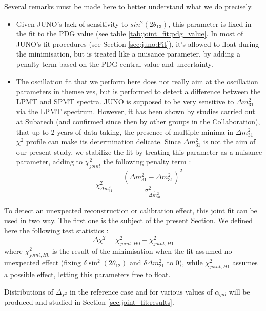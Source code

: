 \documentclass[../main.tex]{subfiles}
\begin{document}
Several remarks must be made here to better understand what we do precisely.
\begin{itemize}
  \item Given JUNO's lack of sensitivity to $sin^2(2\theta_{13})$, this parameter is fixed in the fit to the PDG value (see table \ref{tab:joint_fit:pdg_value}. In most of JUNO's fit procedures (see Section \ref{sec:juno:Fit}), it's allowed to float during the minimisation, but is treated like a nuisance parameter, by adding a penalty term based on the PDG central value and uncertainty.


 \item The oscillation fit that we perform here does not really aim at the oscillation parameters in themselves, but is performed to detect a difference between the LPMT and SPMT spectra. JUNO is supposed to be very sensitive to $\Delta m^2_{31}$ via the LPMT spectrum. However, it has been shown by studies carried out at Subatech (and confirmed since then by other groups in the Collaboration), that up to 2 years of data taking, the presence of multiple minima in $\Delta m^2_{31}$ $\chi^2$ profile can make its determination delicate. Since $\Delta m^2_{31}$ is not the aim of our present study, we stabilize the fit by treating this parameter as a nuisance parameter, adding to $\chi^2_{joint}$ the following penalty term :
    \begin{equation}
      \chi^2_{\Delta m^2_{31}} = \frac{(\Delta m^2_{31}-\overline{\Delta m^2_{31}})^2}{\sigma^2_{\overline{\Delta m^2_{31}}}}
    \end{equation}
\end{itemize}
\hfill

To detect an unexpected reconstruction or calibration effect, this joint fit can be used in two way. The first one is the subject of the present Section. We defined here the following test statistics :
\begin{equation}
  \Delta \chi^2 = \chi^2_{joint,H0} - \chi^2_{joint, H1}
\end{equation}
where $\chi^2_{joint,H0}$ is the result of the minimisation when the fit assumed no unexpected effect (fixing $\delta \sin^2(2\theta_{12})$ and $\delta \Delta m^2_{21}$ to 0), while $\chi^2_{joint, H1}$ assumes a possible effect, letting this parameters free to float.

Distributions of $\Delta_{\chi^2}$ in the reference case and for various values of $\alpha_{qnl}$ will be produced and studied in Section \ref{sec:joint_fit:results}.
\end{document}
